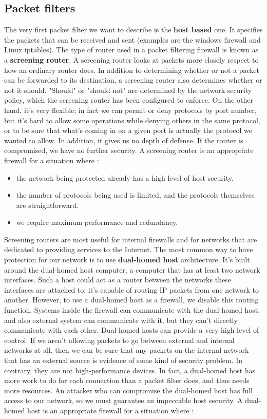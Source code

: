 \documentclass[11pt]{article}
\begin{document}
\subsection{Packet filters}
The very first packet filter we want to describe is the \textbf{host based} one. It specifies the packets that can be received and sent (examples are the windows firewall and Linux iptables). The type of router used in a packet filtering firewall is known as a \textbf{screening router}. A screening router looks at packets more closely respect to how an ordinary router does. In addition to determining whether or not a packet can be forwarded to its destination, a screening router also determines whether or not it should. "Should" or "should not" are determined by the network security policy, which the screening router has been configured to enforce. On the other hand, it's very flexible; in fact we can permit or deny protocols by port number, but it's hard to allow some operations while denying others in the same protocol, or to be sure that what's coming in on a given port is actually the protocol we wanted to allow. In addition, it gives us no depth of defense. If the router is compromised, we have no further security. A screening router is an appropriate firewall for a situation where :
\begin{itemize}
\item the network being protected already has a high level of host security.
\item the number of protocols being used is limited, and the protocols themselves are straightforward.
\item we require maximum performance and redundancy.
\end{itemize}
Screening routers are most useful for internal firewalls and for networks that are dedicated to providing services to the Internet.
The most common way to have protection for our network is to use \textbf{dual-homed host} architecture. It's built around the dual-homed host computer, a computer that has at least two network interfaces. Such a host could act as a router between the networks these interfaces are attached to; it's capable of routing IP packets from one network to another. However, to use a dual-homed host as a firewall, we disable this routing function. Systems inside the firewall can communicate with the dual-homed host, and also external system can communicate with it, but they can't directly communicate with each other. Dual-homed hosts can provide a very high level of control. If we aren't allowing packets to go between external and internal networks at all, then we can be sure that any packets on the internal network that has an external source is evidence of some kind of security problem. In contrary, they are not high-performance devices. In fact, a dual-homed host has more work to do for each connection than a packet filter does, and thus needs more resources. An attacker who can compromise the dual-homed host has full access to our network, so we must guarantee an impeccable host security. A dual-homed host is an appropriate firewall for a situation where :
\end{document}
